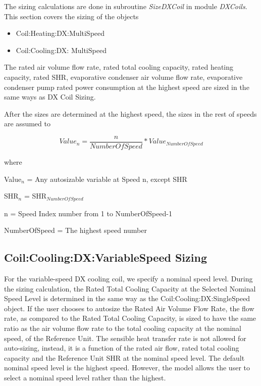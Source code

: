 The sizing calculations are done in subroutine \emph{SizeDXCoil} in module \emph{DXCoils}. This section covers the sizing of the objects

\begin{itemize}
\item
  Coil:Heating:DX:MultiSpeed
\item
  Coil:Cooling:DX: MultiSpeed
\end{itemize}

The rated air volume flow rate, rated total cooling capacity, rated heating capacity, rated SHR, evaporative condenser air volume flow rate, evaporative condenser pump rated power consumption at the highest speed are sized in the same ways as DX Coil Sizing.

After the sizes are determined at the highest speed, the sizes in the rest of speeds are assumed to

\begin{equation}
Valu{e_n} = \frac{n}{{NumberOfSpeed}}*Valu{e_{NumberOfSpeed}}
\end{equation}

where

Value\(_{n}\) = Any autosizable variable at Speed n, except SHR

SHR\(_{n}\) = SHR\(_{NumberOfSpeed}\)

n = Speed Index number from 1 to NumberOfSpeed-1

NumberOfSpeed = The highest speed number

\subsection{Coil:Cooling:DX:VariableSpeed Sizing}\label{coilcoolingdxvariablespeed-sizing}

For the variable-speed DX cooling coil, we specify a nominal speed level. During the sizing calculation, the Rated Total Cooling Capacity at the Selected Nominal Speed Level is determined in the same way as the Coil:Cooling:DX:SingleSpeed object. If the user chooses to autosize the Rated Air Volume Flow Rate, the flow rate, as compared to the Rated Total Cooling Capacity, is sized to have the same ratio as the air volume flow rate to the total cooling capacity at the nominal speed, of the Reference Unit. The sensible heat transfer rate is not allowed for auto-sizing, instead, it is a function of the rated air flow, rated total cooling capacity and the Reference Unit SHR at the nominal speed level. The default nominal speed level is the highest speed. However, the model allows the user to select a nominal speed level rather than the highest.

